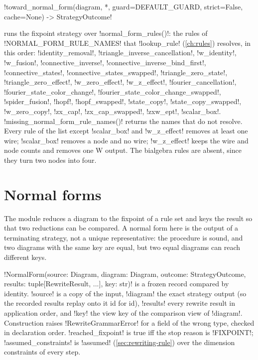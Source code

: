 \begin{signature}
\py!toward_normal_form(diagram, *, guard=DEFAULT_GUARD, strict=False, cache=None) -> StrategyOutcome!
\end{signature}
runs the fixpoint strategy over \py!normal_form_rules()!: the rules of \py!NORMAL_FORM_RULE_NAMES!
that \py!lookup_rule! (\cref{ch:rules}) resolves, in this order:
\code!identity_removal!, \code!triangle_inverse_cancellation!, \code!w_identity!, \code!w_fusion!,
\code!connective_inverse!, \code!connective_inverse_bind_first!, \code!connective_states!,
\code!connective_states_swapped!, \code!triangle_zero_state!, \code!triangle_zero_effect!,
\code!w_zero_effect!, \code!w_z_effect!, \code!fourier_cancellation!,
\code!fourier_state_color_change!, \code!fourier_state_color_change_swapped!, \code!spider_fusion!,
\code!hopf!, \code!hopf_swapped!, \code!state_copy!, \code!state_copy_swapped!, \code!w_zero_copy!,
\code!zx_cap!, \code!zx_cap_swapped!, \code!zxw_ept!, \code!scalar_box!.
\py!missing_normal_form_rule_names()! returns the names that do not resolve. Every rule of the list
except \code!scalar_box! and \code!w_z_effect! removes at least one wire; \code!scalar_box! removes a
node and no wire; \code!w_z_effect! keeps the wire and node counts and removes one W output. The
bialgebra rules are absent, since they turn two nodes into four.

\section{Normal forms}\label{sec:rewriting-nf}

The module  reduces a diagram to the fixpoint of a rule set
and keys the result so that two reductions can be compared. A normal form here is the output of a
terminating strategy, not a unique representative: the procedure is sound, and two diagrams with
the same key are equal, but two equal diagrams can reach different keys.

\begin{definition}\label{def:rewriting-nfrec}
\py!NormalForm(source: Diagram, diagram: Diagram, outcome: StrategyOutcome, results: tuple[RewriteResult, ...], key: str)!
is a frozen record compared by identity. \py!source! is a copy of the input, \py!diagram! the exact
strategy output (so the recorded results replay onto it id for id), \py!results! every rewrite
result in application order, and \py!key! the view key of the comparison view of \py!diagram!.
Construction raises \py!RewriteGrammarError! for a field of the wrong type, checked in declaration
order. \py!reached_fixpoint! is true iff the stop reason is \code!FIXPOINT!;
\py!assumed_constraints! is \py!assumed! (\cref{sec:rewriting-rule}) over the dimension
constraints of every step.
\end{definition}

